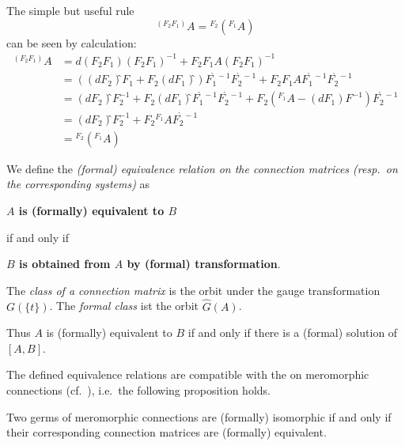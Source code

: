 \begin{rem}\label{rem:distributingTransforamtionRule}
  The simple but useful rule
  \[
    {}^{(F_2F_1)}\!A =
    {}^{F_2}\!\left({}^{F_1}\!A\right)
  \]
  can be seen by calculation:
  \begin{align*}
    {}^{(F_2F_1)}\!A
    &= d(F_2F_1)(F_2F_1)^{-1}+F_2F_1 A(F_2F_1)^{-1}
  \\&=\left(
      \left(dF_2\right)̂F_1
      +F_2\left(dF_1\right)̂
    \right) F_1^{̀-1} F_2^{̀-1}
    +F_2F_1 A F_1^{̀-1}F_2^{̀-1}
  \\&= \left(dF_2\right)̂F_2^{-1}
     +F_2\left(dF_1\right)̂ F_1^{̀-1} F_2^{̀-1}
     +F_2
     \left(
       {}^{F_1}\!A-\left(dF_1\right)F^{-1}
     \right)
     F_2^{̀-1}
  \\&= \left(dF_2\right)̂F_2^{-1} +F_2 {}^{F_1}\!A F_2^{̀-1}
  \\&= {}^{F_2}\!\left({}^{F_1}\!A\right)
  \end{align*}
\end{rem}
\begin{defn}
  We define the \emph{(formal) equivalence relation on the connection matrices
  (resp.\ on the corresponding systems)} as
  \begin{einr}
    \textbf{\boldmath$A$ is (formally) equivalent to $B$}
  \end{einr}
  if and only if
  \begin{einr}
    \textbf{\boldmath$B$ is obtained from $A$ by (formal) transformation}.
  \end{einr}
  The \emph{class of a connection matrix} is the orbit under the gauge
  transformation  $G(\!\{t\}\!)$. The \emph{formal class} ist the
  orbit  $\hat G(A)$.
  \begin{s-rem}
    Thus $A$ is (formally) equivalent to $B$ if and only if there is a (formal)
    solution of $[A,B]$.
  \end{s-rem}
  \begin{comment}
    \begin{s-rem}
      This implies also an equivalence relation and a classification on the
      systems.
    \end{s-rem}
  \end{comment}
\end{defn}

The defined equivalence relations are compatible with the  on meromorphic connections (cf.\ \cite[Lem.5.1.3]{hotta2008}),
i.e.\ the following proposition holds.
\begin{prop}
  Two germs of meromorphic connections are (formally) isomorphic if and only if
  their corresponding connection matrices are (formally) equivalent.
\end{prop}

